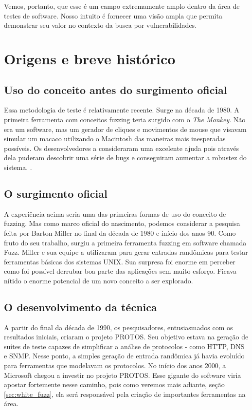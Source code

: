 		Vemos, portanto, que esse é um campo extremamente amplo dentro da área de testes de software.
		Nosso intuito é fornecer uma visão ampla que permita demonstrar seu valor no contexto
		da busca por vulnerabilidades.

	\section{Origens e breve histórico}
	
		\subsection{Uso do conceito antes do surgimento oficial}
			Essa metodologia de teste é relativamente recente. Surge na década de 1980.
			A primeira ferramenta com conceitos fuzzing teria surgido com o \textsl{The Monkey}.
			Não era um software, mas um gerador de cliques e movimentos de mouse que visavam simular
			um macaco utilizando o Macintosh das maneiras mais inesperadas possíveis. Os desenvolvedores
			a consideraram uma excelente ajuda pois através dela puderam descobrir uma série de bugs e
			conseguiram aumentar a robustez do sistema. \cite{FolkloreDotOrg}.
	
		\subsection{O surgimento oficial}
			A experiência acima seria uma das primeiras formas de uso do conceito de fuzzing.
			Mas como marco oficial do nascimento, podemos considerar a pesquisa feita por Barton Miller
			no final da década de 1980 e início dos anos 90. Como fruto do seu trabalho, surgiu a primeira
			ferramenta fuzzing em software chamada Fuzz. Miller e sua equipe a utilizaram para gerar entradas
			randômicas para testar ferramentas básicas dos sistemas UNIX. Sua surpresa foi enorme em perceber
			como foi possível derrubar boa parte das aplicações sem muito esforço. Ficava nítido o enorme
			potencial de um novo conceito a ser explorado.

		\subsection{O desenvolvimento da técnica}
			A partir do final da década de 1990, os pesquisadores, entusiasmados com os resultados
			iniciais, criaram o projeto PROTOS. Seu objetivo estava na geração de suítes de teste capazes
			de simplificar a análise de protocolos - como HTTP, DNS e SNMP.
			Nesse ponto, a simples geração de entrada randômica já havia evoluído para ferramentas
			que modelavam os protocolos.
			No início dos anos 2000, a Microsoft chegou a investir no projeto PROTOS.
			Esse gigante do software viria apostar fortemente nesse caminho, pois como veremos
			mais adiante, seção \ref{sec:white_fuzz}, ela será responsável pela criação de importantes 
			ferramentas na área.

